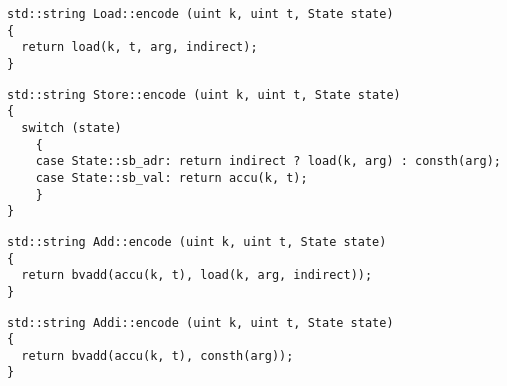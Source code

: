 
\begin{lstlisting}[style=c++, style=encode]
std::string Load::encode (uint k, uint t, State state)
{
  return load(k, t, arg, indirect);
}
\end{lstlisting}


\begin{lstlisting}[style=c++, style=encode]
std::string Store::encode (uint k, uint t, State state)
{
  switch (state)
    {
    case State::sb_adr: return indirect ? load(k, arg) : consth(arg);
    case State::sb_val: return accu(k, t);
    }
}
\end{lstlisting}


\begin{lstlisting}[style=c++, style=encode]
std::string Add::encode (uint k, uint t, State state)
{
  return bvadd(accu(k, t), load(k, arg, indirect));
}
\end{lstlisting}


\begin{lstlisting}[style=c++, style=encode]
std::string Addi::encode (uint k, uint t, State state)
{
  return bvadd(accu(k, t), consth(arg));
}
\end{lstlisting}


